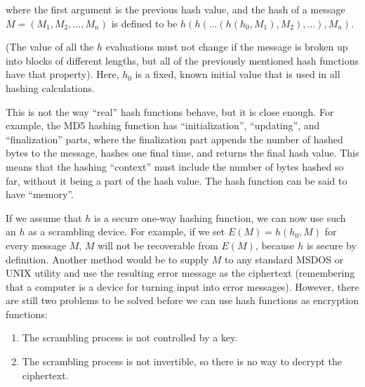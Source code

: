 where the first argument is the previous hash value, and the hash of a message
$M = ( M_1, M_2, ..., M_n )$ is defined to be
$h( h( ...( h( h_0 , M_1 ), M_2 ), ... ), M_n )$.

(The value of all the $h$ evaluations must not change if the message is broken up
into blocks of different lengths, but all of the previously mentioned hash
functions have that property).  Here, $h_0$ is a fixed, known initial value that
is used in all hashing calculations.

This is not the way ``real'' hash functions behave, but it is close enough.  For
example, the MD5 hashing function has ``initialization'', ``updating'', and
``finalization'' parts, where the finalization part appends the number of hashed
bytes to the message, hashes one final time, and returns the final hash value.
This means that the hashing ``context'' must include the number of bytes hashed
so far, without it being a part of the hash value.  The hash function can be
said to have ``memory''.

If we assume that $h$ is a secure one-way hashing function, we can now use such
an $h$ as a scrambling device.  For example, if we set $E( M ) = h( h_0, M )$ for
every message $M$, $M$ will not be recoverable from $E( M )$, because $h$ is secure by
definition.  Another method would be to supply $M$ to any standard MSDOS or UNIX
utility and use the resulting error message as the ciphertext (remembering that 
a computer is a device for turning input into error messages).  However, there
are still two problems to be solved before we can use hash functions as
encryption functions:

\begin{enumerate}
    \item The scrambling process is not controlled by a key.

    \item The scrambling process is not invertible, so there is no way to
       decrypt the ciphertext.
\end{enumerate}

